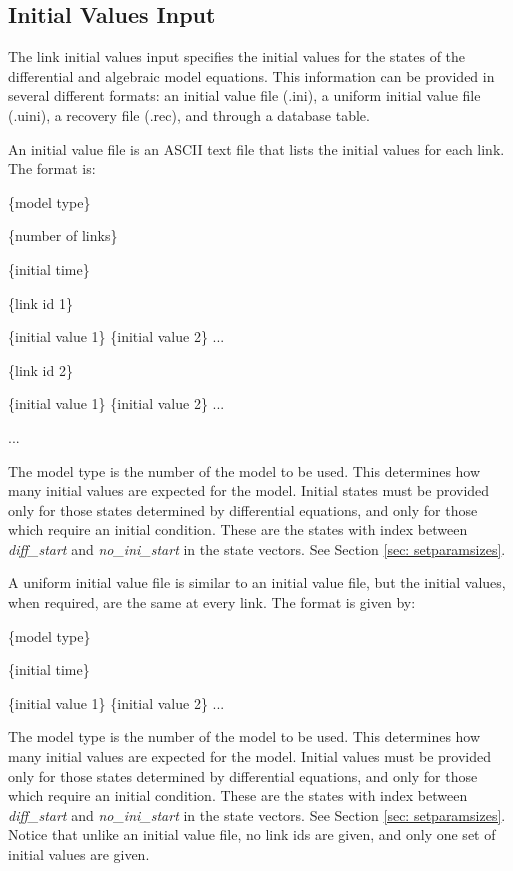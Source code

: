 \documentclass[12pt]{article}
\newenvironment{codeindent}
{\begin{list}{}
        {\setlength{\leftmargin}{.1in}}
        \item[]
}
{\end{list}}
\begin{document}
\subsection{Initial Values Input} \label{sec: initial values input}

The link initial values input specifies the initial values for the states of the differential and algebraic model equations. This information can be provided in several different formats: an initial value file (.ini), a uniform initial value file (.uini), a recovery file (.rec), and through a database table.

An initial value file is an ASCII text file that lists the initial values for each link. The format is:
\begin{codeindent}
 \{model type\}
 
 \{number of links\}
 
 \{initial time\}
 
 \{link id 1\}
 
 \{initial value 1\} \{initial value 2\} ...
 
 \{link id 2\}
 
 \{initial value 1\} \{initial value 2\} ...
 
 ...
\end{codeindent}
The model type is the number of the model to be used. This determines how many initial values are expected for the model. Initial states must be provided only for those states determined by differential equations, and only for those which require an initial condition. These are the states with index between \emph{diff\_start} and \emph{no\_ini\_start} in the state vectors. See Section \ref{sec: setparamsizes}.

A uniform initial value file is similar to an initial value file, but the initial values, when required, are the same at every link. The format is given by:
\begin{codeindent}
 \{model type\}
 
 \{initial time\}
 
 \{initial value 1\} \{initial value 2\} ...
\end{codeindent}
The model type is the number of the model to be used. This determines how many initial values are expected for the model. Initial values must be provided only for those states determined by differential equations, and only for those which require an initial condition. These are the states with index between \emph{diff\_start} and \emph{no\_ini\_start} in the state vectors. See Section \ref{sec: setparamsizes}. Notice that unlike an initial value file, no link ids are given, and only one set of initial values are given.
\end{document}
